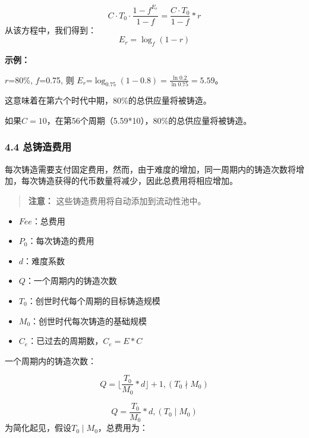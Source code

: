 \documentclass[
]{article}
\providecommand{\tightlist}{%
  \setlength{\itemsep}{0pt}\setlength{\parskip}{0pt}}
\begin{document}
\begin{equation}
C \cdot T_0 \cdot \frac{1-f^{E_r}}{1-f} = \frac{C \cdot T_0}{1-f}*r
\end{equation} 从该方程中，我们得到： \begin{equation}
E_r = \log_f(1-r)
\end{equation}

\textbf{示例：}

\(r\)=80\%, \(f\)=0.75, 则
\(E_r\)=\(\log_{0.75}(1-0.8)=\frac{\ln0.2}{\ln0.75}=5.59\)。

这意味着在第六个时代中期，80\%的总供应量将被铸造。

如果\(C=10\)，在第56个周期（5.59*10），80\%的总供应量将被铸造。

\subsubsection{4.4 总铸造费用}\label{ux603bux94f8ux9020ux8d39ux7528}

每次铸造需要支付固定费用，然而，由于难度的增加，同一周期内的铸造次数将增加，每次铸造获得的代币数量将减少，因此总费用将相应增加。

\begin{quote}
\textbf{注意：} 这些铸造费用将自动添加到流动性池中。
\end{quote}

\begin{itemize}
\tightlist
\item
  \(Fee\)：总费用
\item
  \(P_0\)：每次铸造的费用
\item
  \(d\)：难度系数
\item
  \(Q\)：一个周期内的铸造次数
\item
  \(T_0\)：创世时代每个周期的目标铸造规模
\item
  \(M_0\)：创世时代每次铸造的基础规模
\item
  \(C_e\)：已过去的周期数，\(C_e = E * C\)
\end{itemize}

一个周期内的铸造次数：

\begin{equation}
Q = {\lfloor{\frac{T_0}{M_0}*d}\rfloor + 1}, (T_0 \nmid M_0)
\end{equation}

\begin{equation}
Q = \frac{T_0}{M_0}*d, (T_0 \mid M_0)
\end{equation} 为简化起见，假设\(T_0 \mid M_0\)，总费用为：
\end{document}
